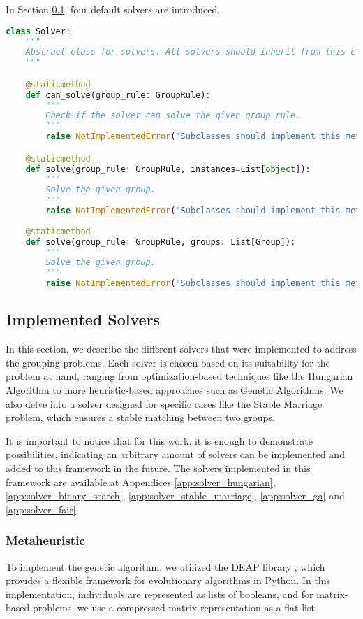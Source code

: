             In Section \ref{sec:implemented_solvers}, four default solvers are introduced.

\begin{lstlisting}[language=Python, caption={Solver Class.}, label={script:solver}]
class Solver:
    """
    Abstract class for solvers. All solvers should inherit from this class.
    """

    @staticmethod
    def can_solve(group_rule: GroupRule):
        """
        Check if the solver can solve the given group_rule.
        """
        raise NotImplementedError("Subclasses should implement this method.")

    @staticmethod
    def solve(group_rule: GroupRule, instances=List[object]):
        """
        Solve the given group.
        """
        raise NotImplementedError("Subclasses should implement this method.")
    
    @staticmethod
    def solve(group_rule: GroupRule, groups: List[Group]):
        """
        Solve the given group.
        """
        raise NotImplementedError("Subclasses should implement this method.")
    \end{lstlisting}

    \subsection{Implemented Solvers}
    \label{sec:implemented_solvers}
    In this section, we describe the different solvers that were implemented to address the grouping problems. Each solver is chosen based on its suitability for the problem at hand, ranging from optimization-based techniques like the Hungarian Algorithm to more heuristic-based approaches such as Genetic Algorithms. We also delve into a solver designed for specific cases like the Stable Marriage problem, which ensures a stable matching between two groups.

    It is important to notice that for this work, it is enough to demonstrate possibilities, indicating an arbitrary amount of solvers can be implemented and added to this framework in the future.
    The solvers implemented in this framework are available at Appendices \ref{app:solver_hungarian}, \ref{app:solver_binary_search}, \ref{app:solver_stable_marriage}, \ref{app:solver_ga} and \ref{app:solver_fair}.

    \subsubsection{Metaheuristic}
        To implement the genetic algorithm, we utilized the DEAP library \cite{deap}, which provides a flexible framework for evolutionary algorithms in Python.
        In this implementation, individuals are represented as lists of booleans, and for matrix-based problems, we use a compressed matrix representation as a flat list.

